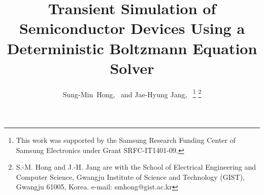 \documentclass[journal]{IEEEtran}
\begin{document}

%
\title{Transient Simulation of Semiconductor Devices Using a Deterministic Boltzmann Equation Solver}
%
%
%

\author{Sung-Min~Hong,~ and Jae-Hyung Jang,~%
\thanks{This work was supported by the Samsung Research Funding Center of Samsung Electronics under Grant SRFC-IT1401-09.}
\thanks{S.-M. Hong and J.-H. Jang are with the School of Electrical Engineering and Computer Science, Gwangju Institute of Science and Technology (GIST), Gwangju 61005, Korea.
e-mail: smhong@gist.ac.kr}}

% 
%
\end{document}
